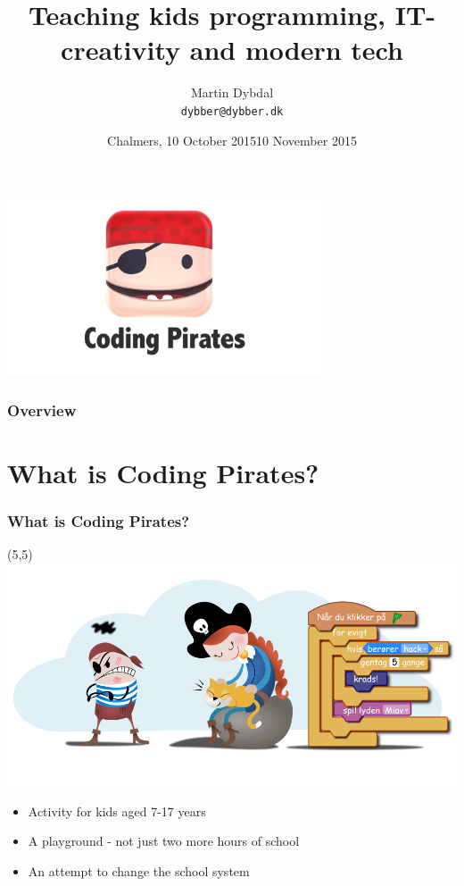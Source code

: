 \documentclass{beamer}
\title[APL \& TAIL] %
  {Teaching kids programming, IT-creativity and modern tech} %
\author{\footnotesize{Martin Dybdal} \\ \footnotesize{\texttt{dybber@dybber.dk}}}
\institute {
DIKU \\
University of Copenhagen
}
\date{\footnotesize{Chalmers, 10 October 2015}}
\date{10 November 2015}
\begin{document}
{
\begin{frame}
  \begin{center}
    \includegraphics[width=0.7\textwidth]{imagery/codingpirates.png}
  \end{center}
\vspace{-1cm}
\titlepage
\end{frame}
}


\begin{frame}
\frametitle{Overview}
\tableofcontents
\end{frame}


\section{What is Coding Pirates?}
\begin{frame}
\frametitle{What is Coding Pirates?}
\begin{textblock}{20}(5,5)
 \includegraphics[width=\textwidth]{imagery/cpthack-and-miss1337-transp.png}
\end{textblock}

\begin{itemize}
\item Activity for kids aged 7-17 years
\item A playground - not just two more hours of school
\item An attempt to change the school system
\end{itemize}
\vspace{2cm}
\end{frame}
\end{document}

